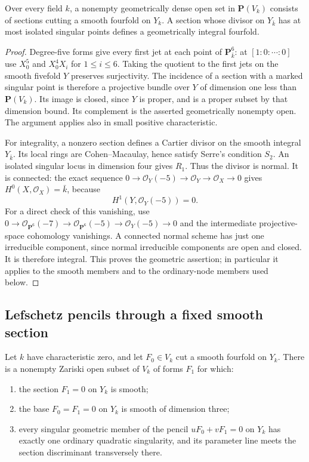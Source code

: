 \begin{lemma}
\label{r18cg:smooth-integral}
Over every field $k$, a nonempty geometrically dense open set in
$\mathbf P(V_k)$ consists of sections cutting a smooth fourfold
on $Y_k$.  A section whose divisor on $Y_{\bar k}$ has at most
isolated singular points defines a geometrically integral fourfold.
\end{lemma}

\begin{proof}
Degree-five forms give every first jet at each point of
$\mathbf P^6_{\bar k}$: at $[1:0:\cdots:0]$ use $X_0^5$ and
$X_0^4X_i$ for $1\le i\le6$.  Taking the quotient to the
first jets on the smooth fivefold $Y$ preserves surjectivity.
The incidence of a section with a marked singular point is
therefore a projective bundle over $Y$ of dimension one less
than $\mathbf P(V_k)$.  Its image is closed, since $Y$ is
proper, and is a proper subset by that dimension bound.
Its complement is the asserted geometrically nonempty open.
The argument applies also in small positive characteristic.

For integrality, a nonzero section defines a Cartier divisor
on the smooth integral $Y_{\bar k}$.  Its local rings are
Cohen--Macaulay, hence satisfy Serre's condition $S_2$.
An isolated singular locus in dimension four gives $R_1$.
Thus the divisor is normal.  It is connected: the exact sequence
$0\to\mathcal O_Y(-5)\to\mathcal O_Y\to\mathcal O_X\to0$
gives $H^0(X,\mathcal O_X)=\bar k$, because
\[
                   H^1(Y,\mathcal O_Y(-5))=0.
\]
For a direct check of this vanishing, use
$0\to\mathcal O_{\mathbf P^6}(-7)\to
\mathcal O_{\mathbf P^6}(-5)\to\mathcal O_Y(-5)\to0$
and the intermediate projective-space cohomology vanishings.
A connected normal scheme has just one irreducible component,
since normal irreducible components are open and closed.
It is therefore integral.  This proves the geometric assertion;
in particular it applies to the smooth members and to the
ordinary-node members used below.
\end{proof}

\subsection{Lefschetz pencils through a fixed smooth section}

\begin{lemma}
\label{r18cg:fixed-member}
Let $k$ have characteristic zero, and let $F_0\in V_k$ cut a
smooth fourfold on $Y_k$.  There is a nonempty Zariski open
subset of $V_k$ of forms $F_1$ for which:
\begin{enumerate}
\item the section $F_1=0$ on $Y_k$ is smooth;
\item the base $F_0=F_1=0$ on $Y_k$ is smooth of dimension three;
\item every singular geometric member of the pencil
      $uF_0+vF_1=0$ on $Y_k$ has exactly one ordinary quadratic
      singularity, and its parameter line meets the section
      discriminant transversely there.
\end{enumerate}
\end{lemma}

